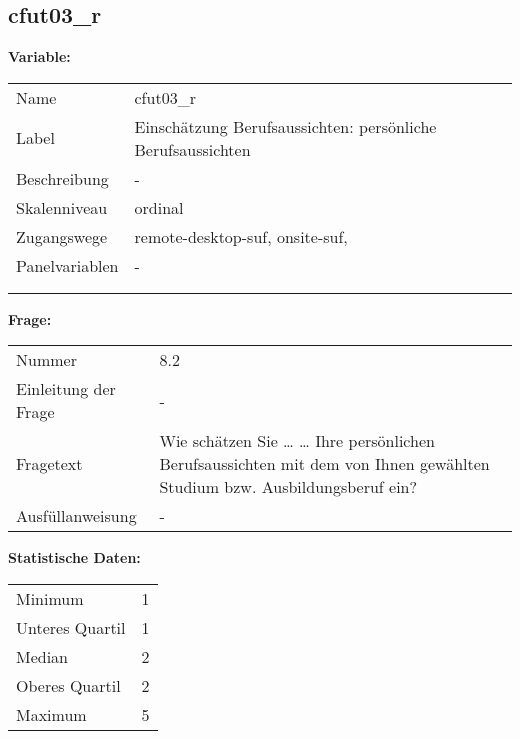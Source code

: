 	
	
	\subsection{cfut03\_r}
	\label{subSection:cfut03_r}

	\noindent\textbf{Variable:}\\
		\begin{tabular}{lL{11.3cm}}
			\label{tableVariable:cfut03_r}
			Name & cfut03\_r \\
			Label & Einschätzung Berufsaussichten: persönliche Berufsaussichten \\
			Beschreibung & - \\
			Skalenniveau & ordinal \\
			Zugangswege &
				remote-desktop-suf,
				onsite-suf,
 \\
			Panelvariablen & -
			 \\
			 \\
 \\
		\end{tabular}

		\vspace*{1 cm}
		\noindent\textbf{Frage:}\\
		\begin{tabular}{lL{11.3cm}}
			\label{tableQuestion:cfut03_r}
			Nummer & 8.2 \\
			Einleitung der Frage & - \\
			Fragetext & Wie schätzen Sie …
… Ihre persönlichen Berufsaussichten mit dem von Ihnen gewählten Studium bzw. Ausbildungsberuf ein? \\
			Ausfüllanweisung & - \\
		\end{tabular}


		\vspace*{1 cm}
		\noindent\textbf{Statistische Daten:}\\
			\begin{tabular}{ll}
				\label{tableStatistics:cfut03_r}
					Minimum & 1 \\
					Unteres Quartil & 1 \\
					Median & 2 \\
					Oberes Quartil & 2 \\
					Maximum & 5 \\
			\end{tabular}



